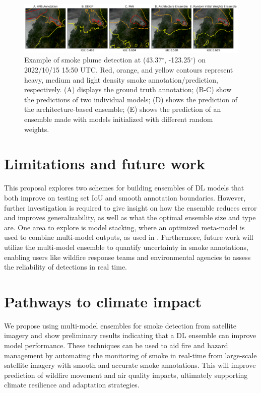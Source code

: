 \documentclass{article}
\begin{document}
\begin{figure}[h]
    \centering
    \includegraphics[width=\textwidth]{ensemble_panel_tinypaper.png}
    \caption{Example of smoke plume detection at (43.37$^{\circ}$, -123.25$^{\circ}$) on 2022/10/15 15:50 UTC. Red, orange, and yellow contours represent heavy, medium and light density smoke annotation/prediction, respectively. (A) displays the ground truth annotation; (B-C) show the predictions of two individual models; (D) shows the prediction of the architecture-based ensemble; (E) shows the prediction of an ensemble made with models initialized with different random weights.}
    \label{fig:ensemble_panel}
\end{figure}
\section{Limitations and future work} This proposal explores two schemes for building ensembles of DL models that both improve on testing set IoU and smooth annotation boundaries. However, further investigation is required to give insight on how the ensemble reduces error and improves generalizability, as well as what the optimal ensemble size and type are. One area to explore is model stacking, where an optimized meta-model is used to combine multi-model outputs, as used in \cite{stacking-smoke-falcao, ensemble-fire-Sivanuja, stacking-wildfire-severity, pm2.5-stack, rainfall-stack}. Furthermore, future work will utilize the multi-model ensemble to quantify uncertainty in smoke annotations, enabling users like wildfire response teams and environmental agencies to assess the reliability of detections in real time. 

\section{Pathways to climate impact} We propose using multi-model ensembles for smoke detection from satellite imagery and show preliminary results indicating that a DL ensemble can improve model performance. These techniques can be used to aid fire and hazard management by automating the monitoring of smoke in real-time from large-scale satellite imagery with smooth and accurate smoke annotations. This will improve prediction of wildfire movement and air quality impacts, ultimately supporting climate resilience and adaptation strategies.
\end{document}
